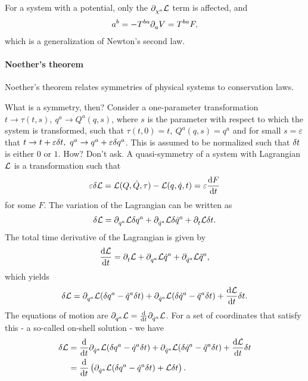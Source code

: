For a system with a potential, only the $\partial^{}_{\chi^{a}}\mathcal{L}$ term is affected, and
\begin{align*}
	a^{b} = - T^{ba}\partial^{}_{a}V = T^{ba}F,
\end{align*}
which is a generalization of Newton's second law.

\paragraph{Noether's theorem}
Noether's theorem relates symmetries of physical systems to conservation laws.

What is a symmetry, then? Consider a one-parameter transformation $t\to\tau(t, s),\ q^{a}\to Q^{a}(q, s)$, where $s$ is the parameter with respect to which the system is transformed, such that $\tau(t, 0) = t,\ Q^{a}(q, s) = q^{a}$ and for small $s = \varepsilon$ that $t\to t + \varepsilon\delta t,\ q^{a}\to q^{a} + \varepsilon\delta q^{a}$. This is assumed to be normalized such that $\delta t$ is either $0$ or $1$. How? Don't ask. A quasi-symmetry of a system with Lagrangian $\mathcal{L}$ is a transformation such that
\begin{align*}
	\varepsilon\delta \mathcal{L} = \mathcal{L}(Q, \dot{Q}, \tau) - \mathcal{L}(q, \dot{q}, t) = \varepsilon\dv{F}{t}
\end{align*}
for some $F$. The variation of the Lagrangian can be written as
\begin{align*}
	\delta \mathcal{L} = \partial^{}_{q^{a}}\mathcal{L}\delta q^{a} + \partial^{}_{\dot{q}^{a}}\mathcal{L}\delta \dot{q}^{a} + \partial^{}_{t}\mathcal{L}\delta t.
\end{align*}
The total time derivative of the Lagrangian is given by
\begin{align*}
	\dv{\mathcal{L}}{t} = \partial^{}_{t}\mathcal{L} + \partial^{}_{q^{a}}\mathcal{L}\dot{q}^{a} + \partial^{}_{\dot{q}^{a}}\mathcal{L}\ddot{q}^{a},
\end{align*}
which yields
\begin{align*}
	\delta \mathcal{L} = \partial^{}_{q^{a}}\mathcal{L}(\delta q^{a} - \dot{q}^{a}\delta t) + \partial^{}_{\dot{q}^{a}}\mathcal{L}(\delta \dot{q}^{a} - \ddot{q}^{a}\delta t) + \dv{\mathcal{L}}{t}\delta t.
\end{align*}
The equations of motion are $\partial^{}_{q^{a}}\mathcal{L} = \dv{t}\partial^{}_{\dot{q}^{a}}\mathcal{L}$. For a set of coordinates that satisfy this - a so-called on-shell solution - we have
\begin{align*}
	\delta \mathcal{L} &= \dv{t}\partial^{}_{\dot{q}^{a}}\mathcal{L}(\delta q^{a} - \dot{q}^{a}\delta t) + \partial^{}_{\dot{q}^{a}}\mathcal{L}(\delta \dot{q}^{a} - \ddot{q}^{a}\delta t) + \dv{\mathcal{L}}{t}\delta t \\
	           &= \dv{t}\left(\partial^{}_{\dot{q}^{a}}\mathcal{L}(\delta q^{a} - \dot{q}^{a}\delta t) + \mathcal{L}\delta t\right).
\end{align*}
